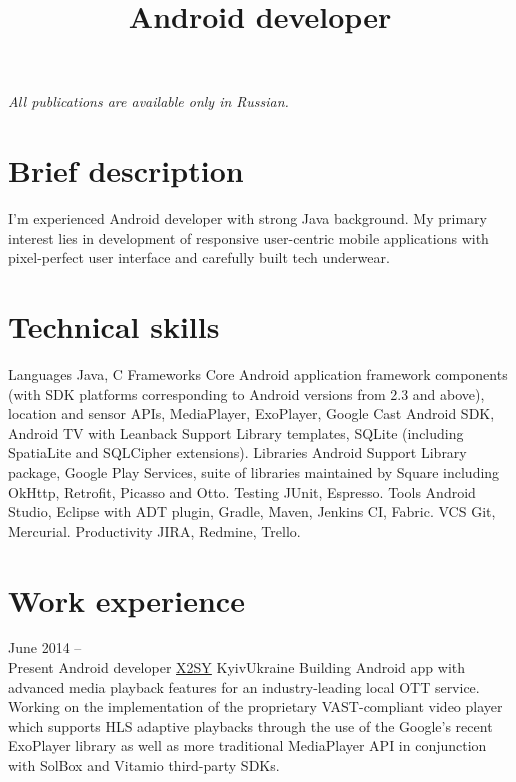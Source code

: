 \renewcommand*{\mobilephonesymbol}{\fixedphonesymbol}
\apptocmd
    {\bibliographyhead}
    {\cvline
        {}
        {\textit{All publications are available only in Russian.}\smallskip}
    }
    {}{}
    

\title{Android developer}
\address{Kyiv, Ukraine}



\makecvtitle

\section{Brief description}
\cvline
    {}
    {I'm experienced Android developer with strong Java background. My primary 
    interest lies in development of responsive user-centric mobile applications 
    with pixel-perfect user interface and carefully built tech underwear.}


\medskip
\section{Technical skills}
\cvitem
    {Languages}
    {Java, C}
\cvitem
    {Frameworks}
    {Core Android application framework components (with SDK platforms 
    corresponding to Android versions from 2.3 and above), 
    location and sensor APIs, MediaPlayer, ExoPlayer, Google Cast Android SDK, 
    Android TV with Leanback Support Library templates, SQLite (including 
    SpatiaLite and SQLCipher extensions).}
\cvitem
    {Libraries}
    {Android Support Library package, Google Play Services, suite of libraries 
    maintained by Square including OkHttp, Retrofit, Picasso and Otto.}
\cvitem
    {Testing}
    {JUnit, Espresso.}
\cvitem
    {Tools}
    {Android Studio, Eclipse with ADT plugin, Gradle, Maven, Jenkins CI, 
    Fabric.}
\cvitem
    {VCS}
    {Git, Mercurial.}
\cvitem
    {Productivity}
    {JIRA, Redmine, Trello.}
    

\medskip
\section{Work experience}

\cventry
    {June 2014 --\\Present}
    {Android developer}
    {\href{http://x2sy.com/}{X2SY}}
    {Kyiv}{Ukraine}
    {
        Building Android app with advanced media playback features for
        \iftoggle{is_nda_compliant}{}{\href{http://megogo.net/}{MEGOGO.NET}~---}
        an industry-leading local OTT service.
        Working on the implementation of the proprietary VAST-compliant 
        video player which supports HLS adaptive playbacks through the 
        use of the Google's recent ExoPlayer library as well as more 
        traditional MediaPlayer API in conjunction with SolBox and 
        Vitamio third-party SDKs.\newline
    }

